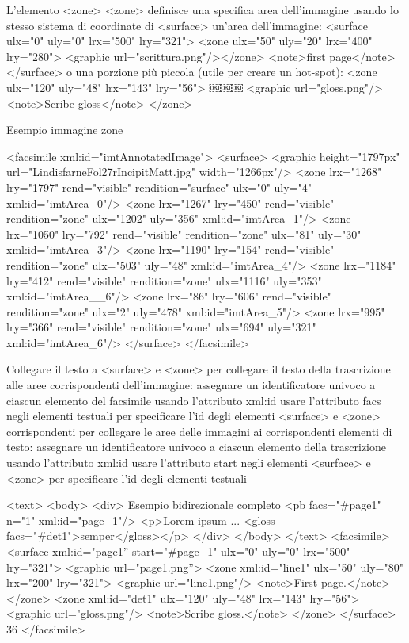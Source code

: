 L’elemento <zone>
<zone> definisce una specifica area dell’immagine usando lo stesso sistema di coordinate di <surface>
un’area dell’immagine:
<surface ulx="0" uly="0" lrx="500" lry="321"> <zone ulx="50" uly="20" lrx="400" lry="280">
<graphic url="scrittura.png"/></zone> <note>first page</note>
</surface>
o una porzione più piccola (utile per creare un hot-spot): <zone ulx="120" uly="48" lrx="143" lry="56">
￼￼￼ <graphic url="gloss.png"/>
 <note>Scribe gloss</note>
</zone>

Esempio immagine zone

<facsimile xml:id="imtAnnotatedImage"> <surface>
<graphic height="1797px" url="LindisfarneFol27rIncipitMatt.jpg" width="1266px"/>
<zone lrx="1268" lry="1797" rend="visible" rendition="surface" ulx="0" uly="­4" xml:id="imtArea_0"/>
<zone lrx="1267" lry="450" rend="visible" rendition="zone" ulx="1202" uly="356" xml:id="imtArea_1"/>
<zone lrx="1050" lry="792" rend="visible" rendition="zone" ulx="81" uly="30" xml:id="imtArea_3"/>
<zone lrx="1190" lry="154" rend="visible" rendition="zone" ulx="503" uly="48" xml:id="imtArea_4"/>
<zone lrx="1184" lry="412" rend="visible" rendition="zone" ulx="1116" uly="353" xml:id="imtArea__6"/>
<zone lrx="86" lry="606" rend="visible" rendition="zone" ulx="2" uly="478" xml:id="imtArea_5"/>
<zone lrx="995" lry="366" rend="visible" rendition="zone" ulx="694" uly="321" xml:id="imtArea_6"/>
  </surface>
</facsimile>

Collegare il testo a <surface> e <zone>
per collegare il testo della trascrizione alle aree corrispondenti dell’immagine:
assegnare un identificatore univoco a ciascun elemento del facsimile usando l’attributo xml:id
usare l’attributo facs negli elementi testuali per specificare l’id degli elementi <surface> e <zone> corrispondenti
per collegare le aree delle immagini ai corrispondenti elementi di testo:
assegnare un identificatore univoco a ciascun elemento della trascrizione usando l’attributo xml:id
usare l’attributo start negli elementi <surface> e <zone> per
specificare l’id degli elementi testuali

<text>
 <body>
  <div>
Esempio bidirezionale completo
<pb facs="#page1" n="1" xml:id="page_1"/>
<p>Lorem ipsum ... <gloss facs="#det1">semper</gloss></p> </div>
 </body>
</text>
<facsimile>
<surface xml:id="page1” start="#page_1" ulx="0" uly="0" lrx="500" lry="321">
<graphic url="page1.png”>
<zone xml:id="line1" ulx="50" uly="80" lrx="200" lry="321">
<graphic url="line1.png"/>
<note>First page.</note> </zone>
<zone xml:id="det1" ulx="120" uly="48" lrx="143" lry="56"> <graphic url="gloss.png"/>
<note>Scribe gloss.</note>
  </zone>
 </surface>
36
</facsimile>

